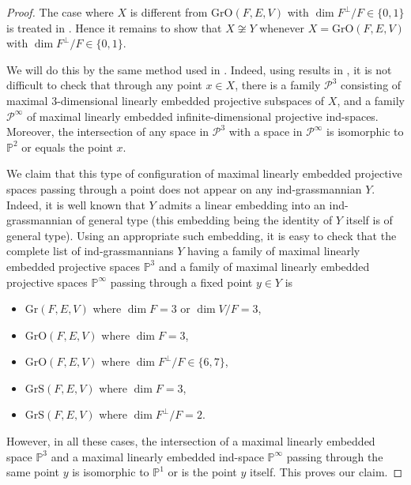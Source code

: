 \documentclass[12pt]{amsart}
\newcommand{\Grass}{\mathrm{Gr}}
\newcommand{\OGrass}{\mathrm{GrO}}
\newcommand{\SGrass}{\mathrm{GrS}}
\theoremstyle{definition}
\begin{document}
\begin{proof}
The case where $X$ is different from $\OGrass(F,E,V)$ with $\dim F^\perp/F\in\{0,1\}$ is treated in \cite[Theorem 2]{PT1}. Hence it remains to show that $X\not\cong Y$ whenever $X=\OGrass(F,E,V)$ with $\dim F^\perp/F\in\{0,1\}$.

We will do this by the same method used in \cite{PT1}.
Indeed, using results in \cite[Section 4]{Landsberg-Manivel}, it is not difficult to check that through any point $x\in X$, there is a family $\mathcal{P}^3$ consisting of maximal $3$-dimensional linearly embedded projective subspaces of $X$, and a family $\mathcal{P}^\infty$ of maximal linearly embedded infinite-dimensional projective ind-spaces. %
Moreover, the intersection of any space in $\mathcal{P}^3$ with a space in $\mathcal{P}^\infty$ is isomorphic to $\mathbb{P}^2$ or equals the point $x$.

We claim that this type of configuration of maximal linearly embedded projective spaces passing through a point does not appear on any ind-grassmannian $Y$. Indeed, it is well known that $Y$ admits a linear embedding into an ind-grassmannian of general type (this embedding being the identity of $Y$ itself is of general type). Using an appropriate such embedding, it is easy to check that
 the complete list of ind-grassmannians $Y$ having a family of maximal linearly embedded projective spaces $\mathbb{P}^3$ and a family of maximal linearly embedded projective spaces $\mathbb{P}^\infty$ passing through a fixed point $y\in Y$ is \begin{itemize}
\item $\Grass(F,E,V)$ where $\dim F=3$ or $\dim V/F=3$,
\item $\OGrass(F,E,V)$ where $\dim F=3$,
\item $\OGrass(F,E,V)$ where $\dim F^\perp/F\in\{6,7\}$,
\item $\SGrass(F,E,V)$ where $\dim F=3$,
\item $\SGrass(F,E,V)$ where $\dim F^\perp/F=2$.
\end{itemize}
However, in all these cases, the intersection of a maximal linearly embedded space $\mathbb{P}^3$ and a maximal linearly embedded ind-space $\mathbb{P}^\infty$ passing through the same point $y$ is isomorphic to $\mathbb{P}^1$ or is the point $y$ itself.
This proves our claim.
\end{proof}
\end{document}
